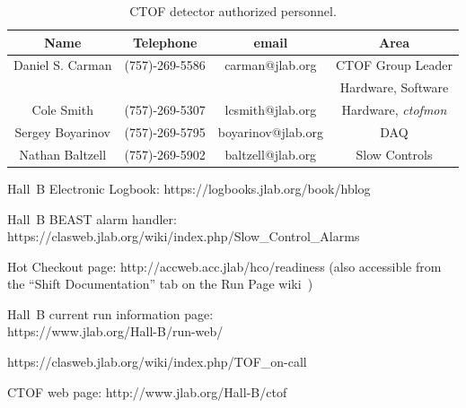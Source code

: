 \documentclass[12pt]{article}
\begin{document}
\begin{table}[htbp]
\begin{center}
\begin{tabular} {|c|c|c|c|} \hline
Name             & Telephone      & email              & Area             \\ \hline \hline
Daniel S. Carman & (757)-269-5586 & carman@jlab.org    & CTOF Group Leader\\
                 &                &                    & Hardware, Software \\ \hline
Cole Smith       & (757)-269-5307 & lcsmith@jlab.org   & Hardware, {\it ctofmon} \\ \hline
Sergey Boyarinov & (757)-269-5795 & boyarinov@jlab.org & DAQ              \\ \hline
Nathan Baltzell  & (757)-269-5902 & baltzell@jlab.org  & Slow Controls    \\ \hline
\end{tabular}
\caption{CTOF detector authorized personnel.}
\label{expert-list}
\end{center}
\end{table}

\clearpage

\vfil
\eject

\begin{thebibliography}{99}

Hall~B Electronic Logbook: https://logbooks.jlab.org/book/hblog

Hall~B BEAST alarm handler: \\
https://clasweb.jlab.org/wiki/index.php/Slow\_Control\_Alarms

Hot Checkout page: http://accweb.acc.jlab/hco/readiness (also accessible from the
``Shift Documentation'' tab on the Run Page wiki~\cite{run-page})

Hall~B current run information page:\\
https://www.jlab.org/Hall-B/run-web/

https://clasweb.jlab.org/wiki/index.php/TOF\_on-call

CTOF web page: http://www.jlab.org/Hall-B/ctof

\end{thebibliography}
\end{document}
